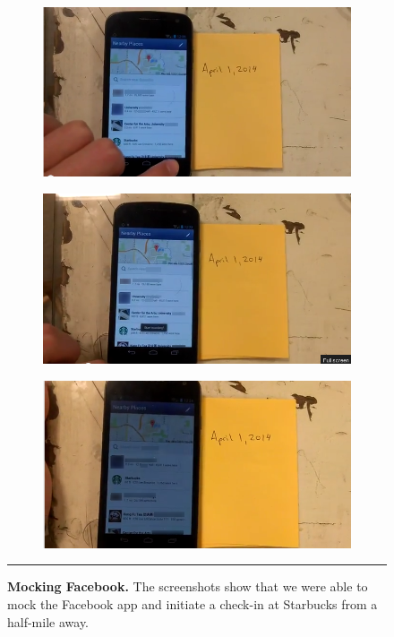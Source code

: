 \begin{figure}[t]
\begin{subfigure}[t]{0.33\textwidth}
\includegraphics[width=\textwidth]{./figures/apps/facebook/facebook1.png}
\caption{}
\end{subfigure}%
\begin{subfigure}[t]{0.33\textwidth}
\includegraphics[width=\textwidth]{./figures/apps/facebook/facebook2.png}
\caption{}
\end{subfigure}%
\begin{subfigure}[t]{0.33\textwidth}
\includegraphics[width=\textwidth]{./figures/apps/facebook/facebook3.png}
\caption{}
\end{subfigure}

\caption{\textbf{Mocking Facebook.} The screenshots show that we were able to
mock the Facebook app and initiate a check-in at Starbucks from a half-mile
away.}

\vspace*{0.1in}
\hrule
\vspace*{-0.15in}

\label{fig-mocking-facebook}

\end{figure}

